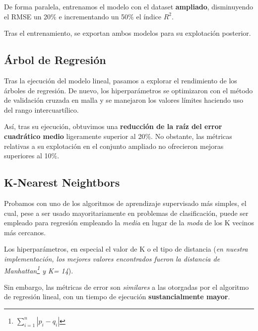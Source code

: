 
De forma paralela, entrenamos el modelo con el dataset \textbf{ampliado}, disminuyendo el RMSE un 20\% e incrementando un 50\% el índice $R^{2}$.

Tras el entrenamiento, se exportan ambos modelos para su explotación posterior.


\subsection{Árbol de Regresión}

Tras la ejecución del modelo lineal, pasamos a explorar el rendimiento de los árboles de regresión.
De nuevo, los hiperparámetros se optimizaron con el método de validación cruzada en malla y se manejaron los valores límites haciendo uso del rango intercuartílico.

Así, tras su ejecución, obtuvimos una \textbf{reducción de la raíz del error cuadrático medio} ligeramente superior al 20\%. No obstante, las métricas relativas a su explotación en el conjunto ampliado no ofrecieron mejoras superiores al 10\%.



\subsection{K-Nearest Neightbors}

Probamos con uno de los algoritmos de aprendizaje supervisado más simples, el cual, pese a ser usado mayoritariamente en problemas de clasificación, puede ser empleado para regresión empleando la \textit{media} en lugar de la \textit{moda} de los K vecinos más cercanos.

Los hiperparámetros, en especial el valor de K o el tipo de distancia (\textit{en nuestra implementación, los mejores valores encontrados fueron la distancia de Manhattan\footnote{\(\sum_{i=1}^{n} |p_{i} - q_{i}|\)} y K= 14}).

Sin embargo, las métricas de error son \textit{similares} a las otorgadas por el algoritmo de regresión lineal, con un tiempo de ejecución \textbf{sustancialmente mayor}.








 